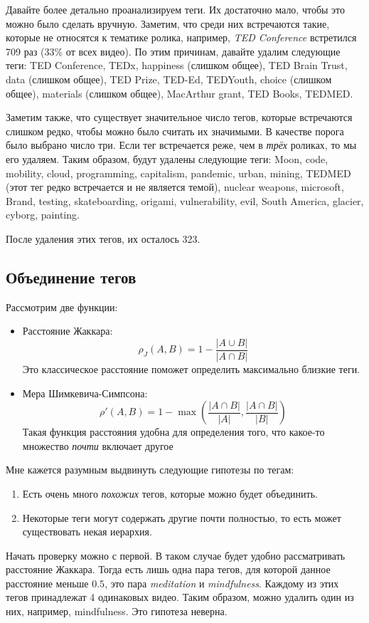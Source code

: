 \documentclass[12pt,a4paper]{scrartcl}
\begin{document}
Давайте более детально проанализируем теги. Их достаточно мало, чтобы это можно было сделать вручную. Заметим, что среди них встречаются такие, которые не относятся к тематике ролика, например, \emph{TED Conference} встретился 709 раз (33\% от всех видео). По этим причинам, давайте удалим следующие теги: TED Conference, TEDx, happiness (слишком общее), TED Brain Trust, data (слишком общее), TED Prize, TED-Ed, TEDYouth, choice (слишком общее), materials (слишком общее), MacArthur grant, TED Books, TEDMED.

Заметим также, что существует значительное число тегов, которые встречаются слишком редко, чтобы можно было считать их значимыми. В качестве порога было выбрано число три. Если тег встречается реже, чем в \emph{трёх} роликах, то мы его удаляем. Таким образом, будут удалены следующие теги: Moon, code, mobility, cloud, programming, capitalism, pandemic, urban, mining, TEDMED (этот тег редко встречается и не является темой), nuclear weapons, microsoft, Brand, testing, skateboarding, origami, vulnerability, evil, South America, glacier, cyborg, painting.

После удаления этих тегов, их осталось 323.
\subsection{Объединение тегов}
Рассмотрим две функции:
\begin{itemize}
\item Расстояние Жаккара:
$$\rho_J\left( A, B \right) = 1 - \frac{\left|A \cup B\right|}{\left| A \cap B \right|}$$
Это классическое расстояние поможет определить максимально близкие теги.

\item Мера Шимкевича-Симпсона:
$$\rho'\left( A, B \right) = 1 - \max \left( \frac{\left|A \cap B\right|}{|A|} , \frac{\left|A \cap B\right|}{|B|} \right)$$
Такая функция расстояния удобна для определения того, что какое-то множество \emph{почти} включает другое
\end{itemize}

Мне кажется разумным выдвинуть следующие гипотезы по тегам:
\begin{enumerate}
\item Есть очень много \emph{похожих} тегов, которые можно будет объединить.
\item Некоторые теги могут содержать другие почти полностью, то есть может существовать некая  иерархия.
\end{enumerate}
Начать проверку можно с первой. В таком случае будет удобно рассматривать расстояние Жаккара. Тогда есть лишь одна пара тегов, для которой данное расстояние меньше $0.5$, это пара \textit{meditation} и \textit{mindfulness}. Каждому из этих тегов принадлежат 4 одинаковых видео. Таким образом, можно удалить один из них, например, mindfulness. Это гипотеза неверна.
\end{document}
